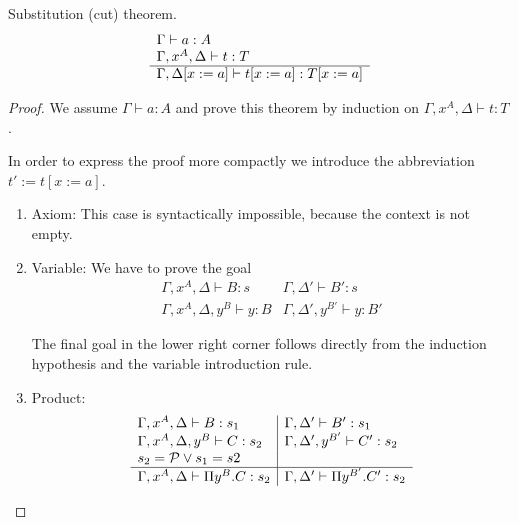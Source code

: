 \begin{theorem}
    \label{substitution-theorem}
    Substitution (cut) theorem.
    $$
    \begin{array}{l} 
        \Gamma \vdash a: A
        \\
        \Gamma, x^A, \Delta \vdash t: T
     \\ \hline 
        \Gamma, \Delta[x:=a] \vdash t[x:=a]: T[x:=a]
    \end{array}
    $$

    \begin{proof}
        We assume
        $\Gamma \vdash a: A$
        and prove this theorem by induction on
        $\Gamma, x^A, \Delta \vdash t: T$.

        In order to express the proof more compactly we introduce the
        abbreviation $t' := t[x:=a]$.

        \begin{enumerate}
            \item Axiom: This case is syntactically impossible, because the
                context is not empty.

            \item Variable: We have to prove the goal
                $$
                \begin{array}{l|l}
                    \Gamma, x^A, \Delta \vdash B: s
                    &
                    \Gamma, \Delta' \vdash B': s
                    \\
                    \hline
                    \Gamma, x^A, \Delta, y^B \vdash y: B
                    &
                    \Gamma, \Delta', y^{B'} \vdash y: B'
                \end{array}
                $$

                The final goal in the lower right corner follows directly from
                the induction hypothesis and the variable introduction rule.

            \item Product:
                $$
                \begin{array}{l|l}
                    \Gamma, x^A, \Delta \vdash B: s_1
                    &
                    \Gamma, \Delta' \vdash B': s_1
                    \\
                    \Gamma, x^A, \Delta, y^B \vdash C: s_2
                    &
                    \Gamma, \Delta', y^{B'} \vdash C': s_2
                    \\
                    s_2 = {\cal P} \lor s_1 = s2
                    \\
                    \hline
                    \Gamma, x^A, \Delta \vdash \Pi y^B. C : s_2
                    &
                    \Gamma, \Delta' \vdash \Pi y^{B'}. C': s_2
                \end{array}
                $$


\end{enumerate}
\end{proof}
\end{theorem}

